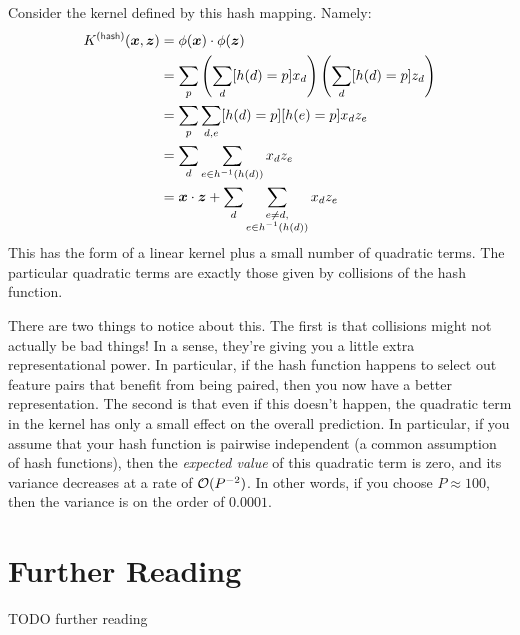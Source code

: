 Consider the kernel defined by this hash mapping.  Namely:
%
\begin{align}
  K\xth{hash}(\vx, \vz) 
  &=
  \dotp{\phi(\vx)}{\phi(\vz)} \\
  &=
  \sum_p \left( \sum_d [h(d) = p] x_d \right) \left( \sum_d [h(d) = p] z_d \right)\\
  &=
  \sum_p \sum_{d,e} [h(d) = p] [h(e) = p] x_d z_e \\
  &=
  \sum_d \sum_{e \in h\inv(h(d))} x_d z_e \\
  &=
  \dotp{\vx}{\vz} + \sum_d \sum_{\substack{e \neq d,\\e \in h\inv(h(d))}} x_d z_e
\end{align}
%
This  has the form of a linear kernel plus a
small number of quadratic terms.  The particular quadratic terms are
exactly those given by collisions of the hash function.

There are two things to notice about this.  The first is that
collisions might not actually be bad things!  In a sense, they're
giving you a little extra representational power.  In particular, if
the hash function happens to select out feature pairs that benefit
from being paired, then you now have a better representation.  The
second is that even if this doesn't happen, the quadratic term in the
kernel has only a small effect on the overall prediction.  In
particular, if you assume that your hash function is pairwise
independent (a common assumption of hash functions), then the
\emph{expected value} of this quadratic term is zero, and its variance
decreases at a rate of $\mathcal{O}(P^{-2})$.  In other words, if you choose
$P \approx 100$, then the variance is on the order of $0.0001$.

\section{Further Reading}

TODO further reading


\begin{comment}
already know (sub)GD from loss.tex
talk about stochastic (sub)GD
formal optimization and duals
hashing tricks
sparsity
\end{comment}


